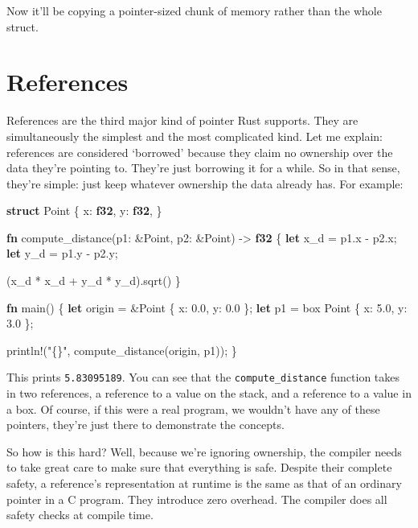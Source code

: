 \documentclass[]{article}
\newenvironment{Shaded}{}{}
\newcommand{\KeywordTok}[1]{\textcolor[rgb]{0.00,0.44,0.13}{\textbf{{#1}}}}
\newcommand{\DecValTok}[1]{\textcolor[rgb]{0.25,0.63,0.44}{{#1}}}
\newcommand{\StringTok}[1]{\textcolor[rgb]{0.25,0.44,0.63}{{#1}}}
\newcommand{\OtherTok}[1]{\textcolor[rgb]{0.00,0.44,0.13}{{#1}}}
\newcommand{\NormalTok}[1]{{#1}}
\begin{document}
Now it'll be copying a pointer-sized chunk of memory rather than the
whole struct.

\section{References}\label{references}

References are the third major kind of pointer Rust supports. They are
simultaneously the simplest and the most complicated kind. Let me
explain: references are considered `borrowed' because they claim no
ownership over the data they're pointing to. They're just borrowing it
for a while. So in that sense, they're simple: just keep whatever
ownership the data already has. For example:

\begin{Shaded}
\begin{Highlighting}[]
\KeywordTok{struct} \NormalTok{Point \{}
    \NormalTok{x: }\KeywordTok{f32}\NormalTok{,}
    \NormalTok{y: }\KeywordTok{f32}\NormalTok{,}
\NormalTok{\}}

\KeywordTok{fn} \NormalTok{compute_distance(p1: &Point, p2: &Point) -> }\KeywordTok{f32} \NormalTok{\{}
    \KeywordTok{let} \NormalTok{x_d = p1.x - p2.x;}
    \KeywordTok{let} \NormalTok{y_d = p1.y - p2.y;}

    \NormalTok{(x_d * x_d + y_d * y_d).sqrt()}
\NormalTok{\}}

\KeywordTok{fn} \NormalTok{main() \{}
    \KeywordTok{let} \NormalTok{origin =    &Point \{ x: }\DecValTok{0.0}\NormalTok{, y: }\DecValTok{0.0} \NormalTok{\};}
    \KeywordTok{let} \NormalTok{p1     = box Point \{ x: }\DecValTok{5.0}\NormalTok{, y: }\DecValTok{3.0} \NormalTok{\};}

    \OtherTok{println!}\NormalTok{(}\StringTok{"\{\}"}\NormalTok{, compute_distance(origin, p1));}
\NormalTok{\}}
\end{Highlighting}
\end{Shaded}

This prints \texttt{5.83095189}. You can see that the
\texttt{compute\_distance} function takes in two references, a reference
to a value on the stack, and a reference to a value in a box. Of course,
if this were a real program, we wouldn't have any of these pointers,
they're just there to demonstrate the concepts.

So how is this hard? Well, because we're ignoring ownership, the
compiler needs to take great care to make sure that everything is safe.
Despite their complete safety, a reference's representation at runtime
is the same as that of an ordinary pointer in a C program. They
introduce zero overhead. The compiler does all safety checks at compile
time.
\end{document}
